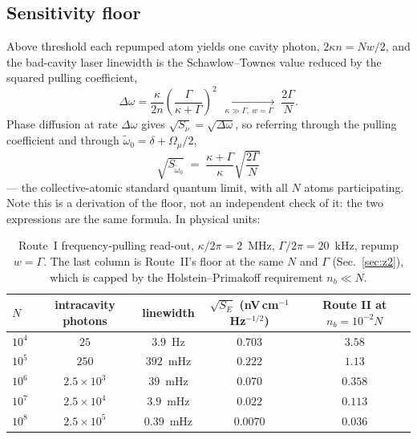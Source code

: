 \documentclass[11pt,a4paper]{article}
\newcommand{\Omu}{\Omega_{\mu}}
\newcommand{\wt}{\tilde{\omega}_{0}}
\begin{document}
\subsection{Sensitivity floor}

Above threshold each repumped atom yields one cavity photon, $2\kappa n = Nw/2$, and the
bad-cavity laser linewidth is the Schawlow--Townes value reduced by the squared pulling
coefficient,
\begin{equation}
  \Delta\omega = \frac{\kappa}{2n}\left(\frac{\Gamma}{\kappa+\Gamma}\right)^{\!2}
  \;\xrightarrow[\ \kappa\gg\Gamma,\ w=\Gamma\ ]{}\; \frac{2\Gamma}{N}.
\end{equation}
Phase diffusion at rate $\Delta\omega$ gives $\sqrt{S_\nu}=\sqrt{\Delta\omega}$, so referring
through the pulling coefficient and through $\wt = \delta+\Omu/2$,
\begin{equation}
  \boxed{\ \sqrt{S_{\wt}} \;=\; \frac{\kappa+\Gamma}{\kappa}\sqrt{\frac{2\Gamma}{N}}\ }
  \label{eq:u1floor}
\end{equation}
--- the collective-atomic standard quantum limit, with all $N$ atoms participating. Note this
is a derivation of the floor, not an independent check of it: the two expressions are the same
formula. In physical units:

\begin{table}[h]
\centering\small
\begin{tabular}{lcccc}
\toprule
$N$ & intracavity photons & linewidth & $\sqrt{S_E}$ (nV\,cm$^{-1}$Hz$^{-1/2}$) & Route II at $n_b=10^{-2}N$\\
\midrule
$10^4$ & $25$      & $3.9$~Hz    & $0.703$ & $3.58$\\
$10^5$ & $250$     & $392$~mHz   & $0.222$ & $1.13$\\
$10^6$ & $2.5\times10^3$ & $39$~mHz & $0.070$ & $0.358$\\
$10^7$ & $2.5\times10^4$ & $3.9$~mHz & $0.022$ & $0.113$\\
$10^8$ & $2.5\times10^5$ & $0.39$~mHz & $0.0070$ & $0.036$\\
\bottomrule
\end{tabular}
\caption{Route~I frequency-pulling read-out, $\kappa/2\pi=2$~MHz, $\Gamma/2\pi=20$~kHz,
repump $w=\Gamma$. The last column is Route~II's floor at the same $N$ and $\Gamma$
(Sec.~\ref{sec:z2}), which is capped by the Holstein--Primakoff requirement $n_b\ll N$.}
\end{table}
\end{document}
